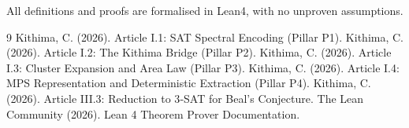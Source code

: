 \documentclass[11pt,a4paper]{article}
\begin{document}
All definitions and proofs are formalised in Lean4, with no unproven assumptions.


\begin{thebibliography}{9}
  Kithima, C. (2026). Article I.1: SAT Spectral Encoding (Pillar P1).
  Kithima, C. (2026). Article I.2: The Kithima Bridge (Pillar P2).
  Kithima, C. (2026). Article I.3: Cluster Expansion and Area Law (Pillar P3).
  Kithima, C. (2026). Article I.4: MPS Representation and Deterministic Extraction (Pillar P4).
  Kithima, C. (2026). Article III.3: Reduction to 3‑SAT for Beal's Conjecture.
  The Lean Community (2026). Lean 4 Theorem Prover Documentation.
\end{thebibliography}
\end{document}
